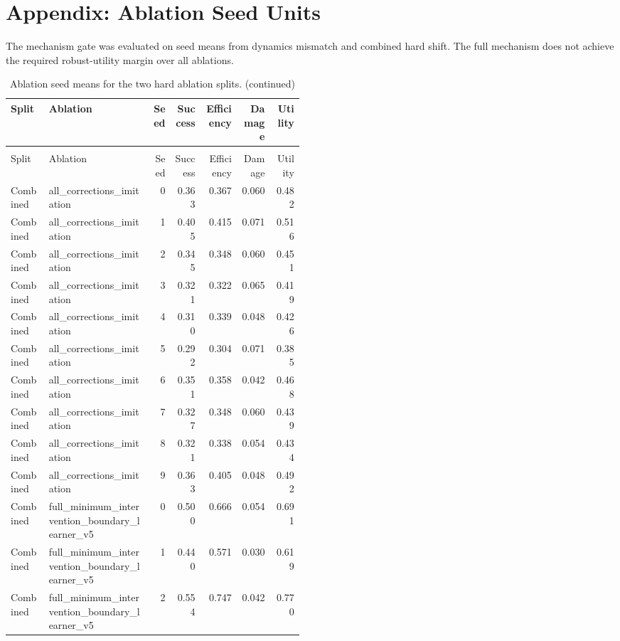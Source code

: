\documentclass{article}
\begin{document}
\section{Appendix: Ablation Seed Units}
The mechanism gate was evaluated on seed means from dynamics mismatch and combined hard shift. The full mechanism does not achieve the required robust-utility margin over all ablations.
\begin{center}
\tiny
\begin{longtable}{p{0.13\linewidth}p{0.35\linewidth}rrrrr}
\caption{Ablation seed means for the two hard ablation splits.}\label{tab:ablation-seed}\\
\toprule
Split & Ablation & Seed & Success & Efficiency & Damage & Utility\\
\midrule
\endfirsthead
\caption[]{Ablation seed means for the two hard ablation splits. (continued)}\\
\toprule
Split & Ablation & Seed & Success & Efficiency & Damage & Utility\\
\midrule
\endhead
Combined & all\_corrections\_imitation & 0 & 0.363 & 0.367 & 0.060 & 0.482\\
Combined & all\_corrections\_imitation & 1 & 0.405 & 0.415 & 0.071 & 0.516\\
Combined & all\_corrections\_imitation & 2 & 0.345 & 0.348 & 0.060 & 0.451\\
Combined & all\_corrections\_imitation & 3 & 0.321 & 0.322 & 0.065 & 0.419\\
Combined & all\_corrections\_imitation & 4 & 0.310 & 0.339 & 0.048 & 0.426\\
Combined & all\_corrections\_imitation & 5 & 0.292 & 0.304 & 0.071 & 0.385\\
Combined & all\_corrections\_imitation & 6 & 0.351 & 0.358 & 0.042 & 0.468\\
Combined & all\_corrections\_imitation & 7 & 0.327 & 0.348 & 0.060 & 0.439\\
Combined & all\_corrections\_imitation & 8 & 0.321 & 0.338 & 0.054 & 0.434\\
Combined & all\_corrections\_imitation & 9 & 0.363 & 0.405 & 0.048 & 0.492\\
Combined & full\_minimum\_intervention\_boundary\_learner\_v5 & 0 & 0.500 & 0.666 & 0.054 & 0.691\\
Combined & full\_minimum\_intervention\_boundary\_learner\_v5 & 1 & 0.440 & 0.571 & 0.030 & 0.619\\
Combined & full\_minimum\_intervention\_boundary\_learner\_v5 & 2 & 0.554 & 0.747 & 0.042 & 0.770\\

\end{longtable}
\end{center}
\end{document}
